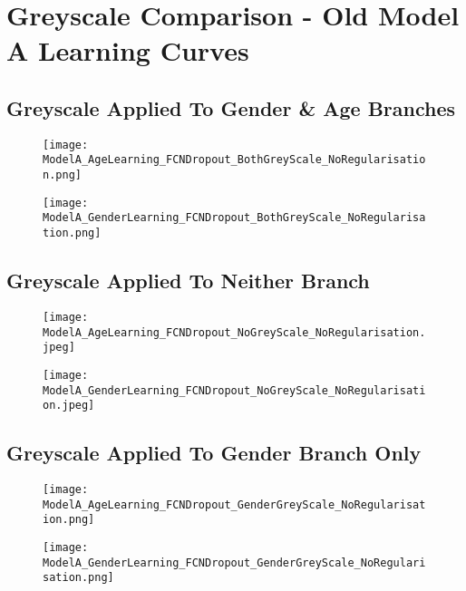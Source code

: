 \appendix
{}
\section{Greyscale Comparison - Old Model A Learning Curves}
\subsection{Greyscale Applied To Gender \& Age Branches}
\begin{figure}[h!]
    \centering
    \texttt{[image: ModelA\_AgeLearning\_FCNDropout\_BothGreyScale\_NoRegularisation.png]}
    \label{fig:modelA_gs_both_age_lc}
\end{figure}
\begin{figure}[h!]
    \centering
    \texttt{[image: ModelA\_GenderLearning\_FCNDropout\_BothGreyScale\_NoRegularisation.png]}
    \label{fig:modelA_gs_both_gender_lc}
\end{figure}
\newpage

\subsection{Greyscale Applied To Neither Branch}
\begin{figure}[h!]
    \centering
    \texttt{[image: ModelA\_AgeLearning\_FCNDropout\_NoGreyScale\_NoRegularisation.jpeg]}
    \label{fig:modelA_gs_neither_age_lc}
\end{figure}
\begin{figure}[h!]
    \centering
    \texttt{[image: ModelA\_GenderLearning\_FCNDropout\_NoGreyScale\_NoRegularisation.jpeg]}
    \label{fig:modelA_gs_neither_gender_lc}
\end{figure}
\newpage

\subsection{Greyscale Applied To Gender Branch Only}
\begin{figure}[h!]
    \centering
    \texttt{[image: ModelA\_AgeLearning\_FCNDropout\_GenderGreyScale\_NoRegularisation.png]}
    \label{fig:modelA_gs_gender_age_lc}
\end{figure}
\begin{figure}[h!]
    \centering
    \texttt{[image: ModelA\_GenderLearning\_FCNDropout\_GenderGreyScale\_NoRegularisation.png]}
    \label{fig:modelA_gs_age_age_lc}
\end{figure}
\newpage


